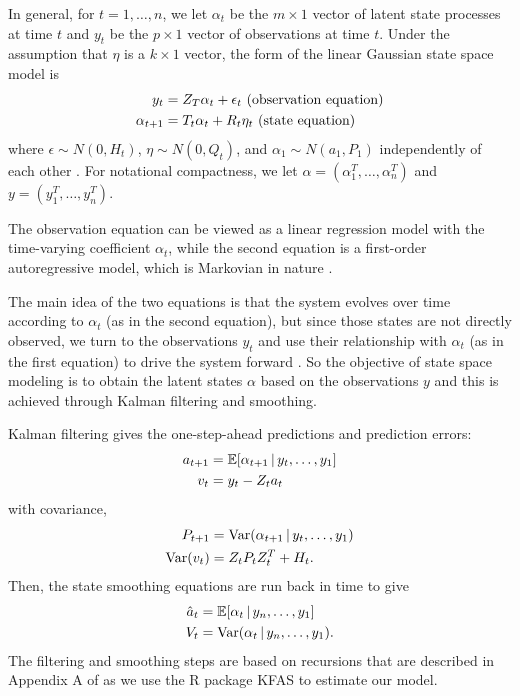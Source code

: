 \documentclass{article}
\begin{document}
In general, for $t = 1, \dots, n$, we let $\alpha_t$ be the $m \times 1$ vector of latent
state processes at time $t$ and $y_t$ be the $p \times 1$ vector of observations
at time $t$. Under the assumption that $\eta$ is a $k \times 1$ vector, the
form of the linear Gaussian state space model is 
\begin{align}
y_t &= Z_T\alpha_t + \epsilon_t  \text{     (observation equation)} \label{eq:ss1}\\
\alpha_{t+1} &= T_t\alpha_t + R_t\eta_t  \text{     (state equation) \label{eq:ss2}}
\end{align}
where $\epsilon \sim N(0, H_t)$, $\eta \sim N(0, Q_t)$, and $\alpha_1 \sim
N(a_1, P_1)$ independently of each other \citep{helske2017kfas}. For notational
compactness, we let $\alpha = \left ( \alpha_1^T, \dots, \alpha_n^T \right )$
and $y = \left ( y_1^T, \dots, y_n^T \right )$.

The observation equation can be viewed as a linear regression model with the
time-varying coefficient $\alpha_t$, while the second equation is a first-order
autoregressive model, which is Markovian in nature \citep{durbin2012time}. 

The main idea of the two equations is that the system evolves over time
according to $\alpha_t$ (as in the second equation), but since those states are
not directly observed, we turn to the observations $y_t$ and use their
relationship with $\alpha_t$ (as in the first equation) to drive the system
forward \citep{durbin2012time}. So the objective of state space modeling is to
obtain the latent states $\alpha$ based on the observations $y$ and this is
achieved through Kalman filtering and smoothing. 

Kalman filtering gives the one-step-ahead predictions and prediction errors:
\begin{align*}
a_{t+1} &= \mathbb{E}[\alpha_{t+1}\, \vert\, y_t, \dots, y_1] \\
v_t &= y_t - Z_ta_t
\end{align*} with covariance, 
\begin{align*}
P_{t+1} &= \operatorname{Var}(\alpha_{t+1}\, \vert\, y_t, \dots, y_1) \\
\operatorname{Var}(v_t) &= Z_tP_tZ_t^T + H_t.
\end{align*}
Then, the state smoothing equations are run back in time to give
\begin{align}
\hat{a}_t &= \mathbb{E}[\alpha_{t}\, \vert\, y_n, \dots, y_1] \label{eq:hatat}\\
V_t &= \operatorname{Var}(\alpha_{t}\, \vert\, y_n, \dots, y_1). \label{eq:Vt}
\end{align}
The filtering and smoothing steps are based on recursions that are described in
Appendix A of \citet{helske2017kfas} as we use the R package KFAS to estimate
our model.
\end{document}
